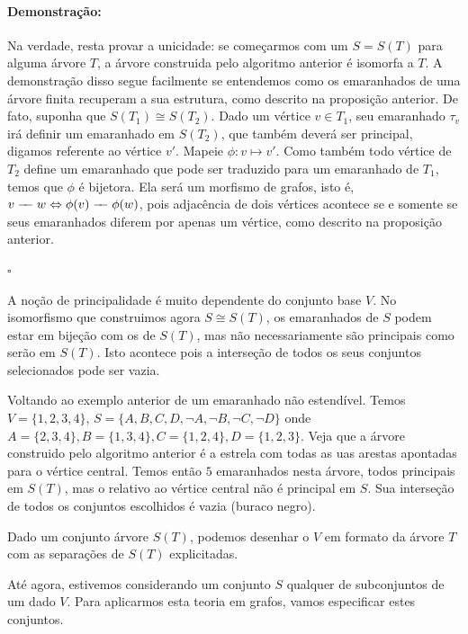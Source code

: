 \documentclass[11pt]{article}
\newcommand{\pulinho}{\vspace{.5cm}}
\newcommand{\edge}{%
  \mathrel{-}%
  \joinrel\joinrel %
  \mathrel{-}%
}
\theoremstyle{definition}
\theoremstyle{definition}
\theoremstyle{definition}
\theoremstyle{definition}
\theoremstyle{definition}
\theoremstyle{definition}
\theoremstyle{definition}
\theoremstyle{definition}
\theoremstyle{definition}
\theoremstyle{definition}
\newtheorem*{example*}{Exemplo}
\newenvironment{exemplo*}{
\definecolor{shadecolor}{HTML}{b9e6d3}
\begin{shaded}
\begin{example*}
}
{
\end{example*}
\end{shaded}
}
\theoremstyle{definition}
\theoremstyle{definition}
\newenvironment{prova}{\paragraph{Demonstração:}}{\hfill$\square$ 
\pulinho
}
\theoremstyle{definition}
\begin{document}
\begin{prova}
Na verdade, resta provar a unicidade: se começarmos com um $S = S(T)$ para alguma árvore $T$, a árvore construida pelo algoritmo anterior é isomorfa a $T$. A demonstração disso segue facilmente se entendemos como os emaranhados de uma árvore finita recuperam a sua estrutura, como descrito na proposição anterior. De fato, suponha que $S(T_1) \cong S(T_2)$. Dado um vértice $v \in T_1$, seu emaranhado $\tau_v$ irá definir um emaranhado em $S(T_2)$, que também deverá ser principal, digamos referente ao vértice $v'$. Mapeie $\phi: v \mapsto v'$. Como também todo vértice de $T_2$ define um emaranhado que pode ser traduzido para um emaranhado de $T_1$, temos que $\phi$ é bijetora. Ela será um morfismo de grafos, isto é, $v \edge w \Leftrightarrow \phi(v) \edge \phi(w)$, pois adjacência de dois vértices acontece se e somente se seus emaranhados diferem por apenas um vértice, como descrito na proposição anterior. 

\end{prova}

A noção de principalidade é muito dependente do conjunto base $V$. No isomorfismo que construimos agora $S \cong S(T)$, os emaranhados de $S$ podem estar em bijeção com os de $S(T)$, mas não necessariamente são principais como serão em $S(T)$. Isto acontece pois a interseção de todos os seus conjuntos selecionados pode ser vazia.

\begin{exemplo*}
  Voltando ao exemplo anterior de um emaranhado não estendível. Temos $V = \{1,2,3,4\}$, $S = \{A,B,C,D,\lnot A, \lnot B, \lnot C, \lnot D\}$ onde $A = \{2,3,4\}, B = \{1,3,4\}, C = \{1,2,4\}, D = \{1,2,3\}$. Veja que a árvore construido pelo algoritmo anterior é a estrela com todas as uas arestas apontadas para o vértice central. Temos então $5$ emaranhados nesta árvore, todos principais em $S(T)$, mas o relativo ao vértice central não é principal em $S$. Sua interseção de todos os conjuntos escolhidos é vazia (buraco negro).

\end{exemplo*}

\begin{exemplo*}[Visualização]
  Dado um conjunto árvore $S(T)$, podemos desenhar o $V$ em formato da árvore $T$ com as separações de $S(T)$ explicitadas.
\end{exemplo*}

Até agora, estivemos considerando um conjunto $S$ qualquer de subconjuntos de um dado $V$. Para aplicarmos esta teoria em grafos, vamos especificar estes conjuntos.
\end{document}
